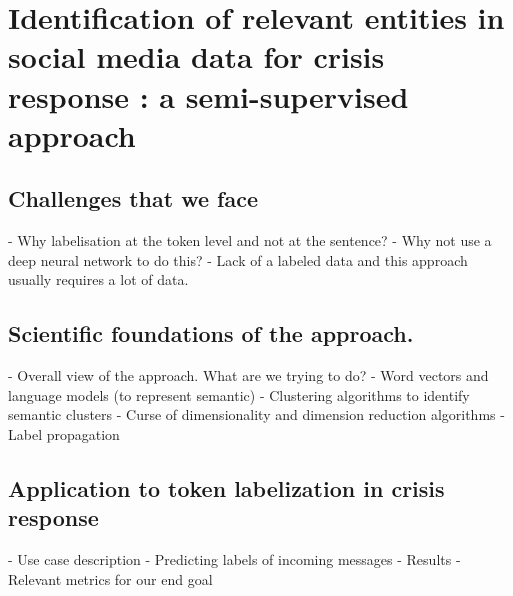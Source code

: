 \chapter{Identification of relevant entities in social media data for crisis response : a semi-supervised approach}

\section{Challenges that we face}
- Why labelisation at the token level and not at the sentence?
- Why not use a deep neural network to do this?
- Lack of a labeled data and this approach usually requires a lot of data.

\section{Scientific foundations of the approach.}
- Overall view of the approach. What are we trying to do?
- Word vectors and language models (to represent semantic)
- Clustering algorithms to identify semantic clusters
- Curse of dimensionality and dimension reduction algorithms
- Label propagation

\section{Application to token labelization in crisis response }
- Use case description
- Predicting labels of incoming messages
- Results
- Relevant metrics for our end goal

